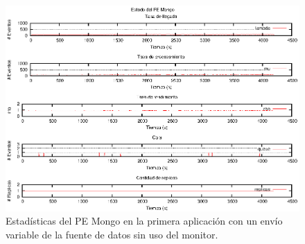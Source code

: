 \begin{figure}[p]
\centering
    \includegraphics[scale=1.1]{images/exp/app1/normal/sm/statusMongoPE.eps}
    \caption{Estadísticas del PE Mongo en la primera aplicación con un envío variable de la fuente de datos sin uso del monitor.}
    \label{fig:app1-normal-statusMongoPE-sm}
\end{figure}

